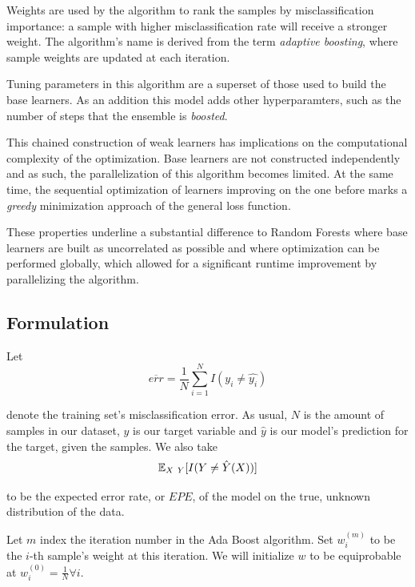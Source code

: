 Weights are used by the algorithm to rank the samples by misclassification importance: a sample with higher misclassification rate will receive a stronger weight.
The algorithm's name is derived from the term \textit{adaptive boosting}, where sample weights are updated at each iteration.

Tuning parameters in this algorithm are a superset of those used to build the base learners.
As an addition this model adds other hyperparamters, such as the number of steps that the ensemble is \textit{boosted}.

This chained construction of weak learners has implications on the computational complexity of the optimization.
Base learners are not constructed independently and as such, the parallelization of this algorithm becomes limited.
At the same time, the sequential optimization of learners improving on the one before marks a \textit{greedy} minimization approach of the general loss function.

These properties underline a substantial difference to Random Forests where base learners are built as uncorrelated as possible and where optimization can be performed globally, which allowed for a significant runtime improvement by parallelizing the algorithm.

\subsection{Formulation}\label{subsection:adaboost_formulation}

Let
\begin{equation}\label{eq:adaBoostTrainingError}
\overline{err} = \frac{1}{N} \sum_{i=1}^{N} I(y_i \neq \hat{y_i})
\end{equation}

denote the training set's misclassification error.
As usual, $N$ is the amount of samples in our dataset, $y$ is our target variable and $\hat{y}$ is our model's prediction for the target, given the samples.
We also take
\begin{equation}
\operatorname{\mathbb{E}}_{X \ Y} [ I(Y \neq \hat{Y}(X)) ]
\end{equation}

to be the expected error rate, or $EPE$, of the model on the true, unknown distribution of the data.

Let $m$ index the iteration number in the Ada Boost algorithm.
Set $w^{(m)}_i$ to be the $i$-th sample's weight at this iteration.
We will initialize $w$ to be equiprobable at $w^{(0)}_i = \frac{1}{N} \forall i$.

